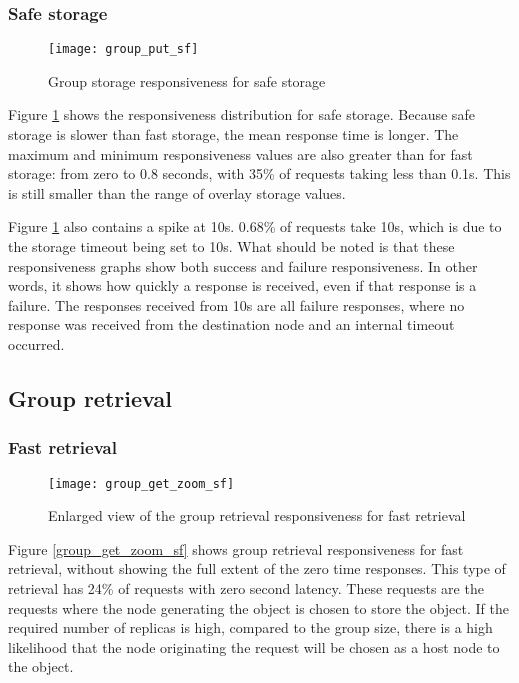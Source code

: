 \subsubsection{Safe storage}
\begin{figure}[htbp]
 \centering
 \texttt{[image: group\_put\_sf]}
 \caption{Group storage responsiveness for safe storage}
 \label{fig_group_put_sf}
\end{figure}
%
Figure \ref{fig_group_put_sf} shows the responsiveness distribution for safe storage. Because safe storage is slower than fast storage, the mean response time is longer. The maximum and minimum responsiveness values are also greater than for fast storage: from zero to 0.8 seconds, with 35\% of requests taking less than 0.1s. This is still smaller than the range of overlay storage values.

Figure \ref{fig_group_put_sf} also contains a spike at 10s. 0.68\% of requests take 10s, which is due to the storage timeout being set to 10s. What should be noted is that these responsiveness graphs show both success and failure responsiveness. In other words, it shows how quickly a response is received, even if that response is a failure. The responses received from 10s are all failure responses, where no response was received from the destination node and an internal timeout occurred.

\subsection{Group retrieval}
\subsubsection{Fast retrieval}

\begin{figure}[htbp]
 \centering
 \texttt{[image: group\_get\_zoom\_sf]}
 \caption{Enlarged view of the group retrieval responsiveness for fast retrieval}
 \label{fig_group_get_zoom_sf}
\end{figure}
%
Figure \ref{group_get_zoom_sf} shows group retrieval responsiveness for fast retrieval, without showing the full extent of the zero time responses. This type of retrieval has 24\% of requests with zero second latency. These requests are the requests where the node generating the object is chosen to store the object. If the required number of replicas is high, compared to the group size, there is a high likelihood that the node originating the request will be chosen as a host node to the object.

